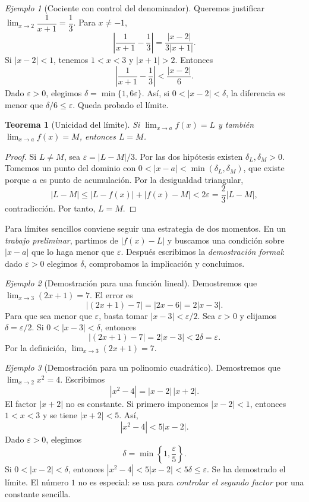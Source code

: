 \documentclass[12pt]{article}
\newtheorem{teorema}[definicion]{Teorema}
\theoremstyle{remark}
\newtheorem{ejemplo}{Ejemplo}
\begin{document}
\begin{ejemplo}[Cociente con control del denominador]
Queremos justificar $\lim_{x\to2}\dfrac1{x+1}=\dfrac13$. Para $x\ne-1$,
\[
 \left|\frac1{x+1}-\frac13\right|=\frac{|x-2|}{3|x+1|}.
\]
Si $|x-2|<1$, tenemos $1<x<3$ y $|x+1|>2$. Entonces
\[
 \left|\frac1{x+1}-\frac13\right|<\frac{|x-2|}{6}.
\]
Dado $\varepsilon>0$, elegimos $\delta=\min\{1,6\varepsilon\}$. Así, si $0<|x-2|<\delta$, la diferencia es menor que $\delta/6\le\varepsilon$. Queda probado el límite.
\end{ejemplo}

\begin{teorema}[Unicidad del límite]
Si $\lim_{x\to a}f(x)=L$ y también $\lim_{x\to a}f(x)=M$, entonces $L=M$.
\end{teorema}
\begin{proof}
Si $L\ne M$, sea $\varepsilon=|L-M|/3$. Por las dos hipótesis existen $\delta_L,\delta_M>0$. Tomemos un punto del dominio con $0<|x-a|<\min(\delta_L,\delta_M)$, que existe porque $a$ es punto de acumulación. Por la desigualdad triangular,
\[
 |L-M|\le|L-f(x)|+|f(x)-M|<2\varepsilon=\frac23|L-M|,
\]
contradicción. Por tanto, $L=M$.
\end{proof}

Para límites sencillos conviene seguir una estrategia de dos momentos. En un \emph{trabajo preliminar}, partimos de $|f(x)-L|$ y buscamos una condición sobre $|x-a|$ que lo haga menor que $\varepsilon$. Después escribimos la \emph{demostración formal}: dado $\varepsilon>0$ elegimos $\delta$, comprobamos la implicación y concluimos.

\begin{ejemplo}[Demostración para una función lineal]
Demostremos que $\lim_{x\to3}(2x+1)=7$. El error es
\[
 |(2x+1)-7|=|2x-6|=2|x-3|.
\]
Para que sea menor que $\varepsilon$, basta tomar $|x-3|<\varepsilon/2$. Sea $\varepsilon>0$ y elijamos $\delta=\varepsilon/2$. Si $0<|x-3|<\delta$, entonces
\[
 |(2x+1)-7|=2|x-3|<2\delta=\varepsilon.
\]
Por la definición, $\boxed{\lim_{x\to3}(2x+1)=7}$.
\end{ejemplo}

\begin{ejemplo}[Demostración para un polinomio cuadrático]
Demostremos que $\lim_{x\to2}x^2=4$. Escribimos
\[
 |x^2-4|=|x-2|\,|x+2|.
\]
El factor $|x+2|$ no es constante. Si primero imponemos $|x-2|<1$, entonces $1<x<3$ y se tiene $|x+2|<5$. Así,
\[
 |x^2-4|<5|x-2|.
\]
Dado $\varepsilon>0$, elegimos
\[
 \boxed{\delta=\min\left\{1,\frac{\varepsilon}{5}\right\}.}
\]
Si $0<|x-2|<\delta$, entonces $|x^2-4|<5|x-2|<5\delta\le\varepsilon$. Se ha demostrado el límite. El número $1$ no es especial: se usa para \emph{controlar el segundo factor} por una constante sencilla.
\end{ejemplo}
\end{document}
